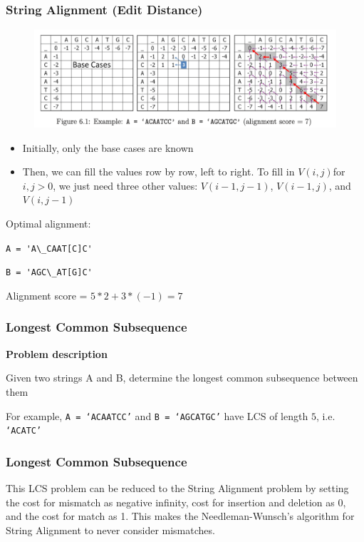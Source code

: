\documentclass{beamer}
\begin{document}
\begin{frame}[fragile]
\frametitle{String Alignment (Edit Distance)}

\begin{figure}
    \centering
    \includegraphics[scale=0.4]{imgs/string_alignment.png}
\end{figure}

\begin{itemize}
    \item Initially, only the base cases are known
    \item Then, we can fill the values row by row, left to right. To fill in $V(i,j) $for$ i,j > 0$, we just need three other values: $V(i-1,j-1)$, $V(i-1,j)$, and $V(i,j-1)$
   
\end{itemize}

\pause 

\vspace{0.3cm}
Optimal alignment:

\verb|A = 'A\_CAAT[C]C'|

\verb|B = 'AGC\_AT[G]C'|

\color{blue}Alignment score = $5*2 + 3*(-1) = 7$\color{black}

\end{frame}

\begin{frame}[fragile]
\frametitle{Longest Common Subsequence}

\color{red}\textbf{Problem description}\color{black} 

Given two strings A and B, determine the longest common subsequence between them

\pause

\vspace{0.3cm}
For example, \verb|A = ‘ACAATCC’| and \verb|B = ‘AGCATGC’| have LCS of length $5$, i.e. \verb|‘ACATC’|


\end{frame}

\begin{frame}[fragile]
\frametitle{Longest Common Subsequence}

This LCS problem can be reduced to the String Alignment problem by setting the cost for mismatch as negative infinity, cost for insertion and deletion as 0, and the cost for match as 1. This makes the Needleman-Wunsch’s algorithm for String Alignment to never consider mismatches.

\end{frame}
\end{document}
